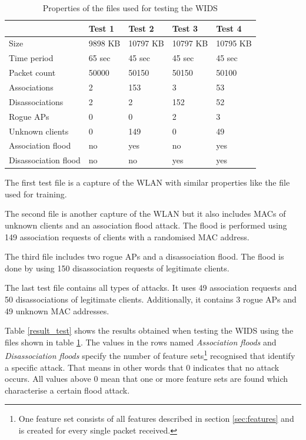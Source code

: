 \begin{table}[htbp]
	\begin{center}
		\begin{tabular}{|l|l|l|l|l|}
		\hline
		&\bf{Test 1}&\bf{Test 2}&\bf{Test 3}&\bf{Test 4} \\
		\hline
		Size&9898 KB&10797 KB&10797 KB&10795 KB\\
		\hline
		Time period&65 sec&45 sec&45 sec&45 sec\\
		\hline
		Packet count&50000&50150&50150&50100\\
		\hline
		Associations&2&153&3&53\\
		\hline
		Disassociations&2&2&152&52\\
		\hline
		\hline
		Rogue APs&0&0&2&3\\
		\hline
		Unknown clients&0&149&0&49\\
		\hline
		Association flood&no&yes&no&yes\\
		\hline
		Disassociation flood&no&no&yes&yes\\
		\hline
		\end{tabular}
	\end{center}
	\vspace{-1em}
	\caption{Properties of the files used for testing the WIDS}
	\label{test_env}
\end{table}

The first test file is a capture of the WLAN with similar properties like the file used for training.

The second file is another capture of the WLAN but it also includes MACs of unknown clients and an association flood attack. The flood is performed using 149 association requests of clients with a randomised MAC address.

The third file includes two rogue APs and a disassociation flood. The flood is done by using 150 disassociation requests of legitimate clients.

The last test file contains all types of attacks. It uses 49 association requests and 50 disassociations of legitimate clients. Additionally, it contains 3 rogue APs and 49 unknown MAC addresses.

Table \ref{result_test} shows the results obtained when testing the WIDS using the files shown in table \ref{test_env}. The values in the rows named {\em Association floods} and {\em Disassociation floods} specify the number of feature sets\footnote{One feature set consists of all features described in section \ref{sec:features} and is created for every single packet received.} recognised that identify a specific attack. That means in other words that $0$ indicates that no attack occurs. All values above $0$ mean that one or more feature sets are found which characterise a certain flood attack.

